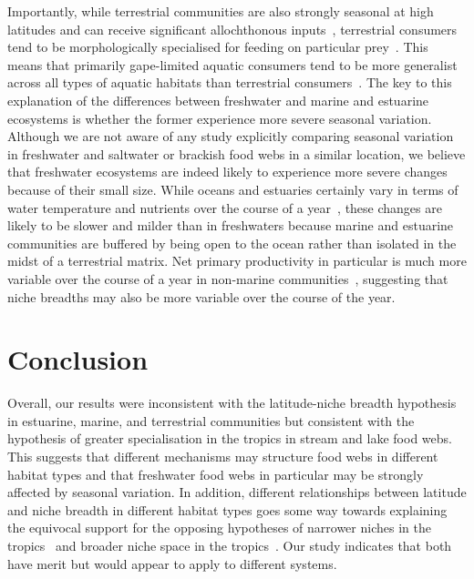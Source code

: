 \documentclass[12pt]{article}
\begin{document}
  Importantly, while terrestrial communities are also strongly seasonal at
  high latitudes and can receive significant allochthonous
  inputs~\cite{Nakano2001}, terrestrial consumers tend to be
  morphologically specialised for feeding on particular prey~\cite{Liem1990}.
  This means that primarily gape-limited aquatic consumers tend to be more
  generalist across all types of aquatic habitats than terrestrial consumers~\cite{Liem1990,Shurin2006}. The
  key to this explanation of the differences between freshwater and
  marine and estuarine  ecosystems is whether the former experience more
  severe seasonal variation. Although we are not aware of any study explicitly
  comparing seasonal variation in freshwater and saltwater or brackish food
  webs in a similar location, we believe that freshwater ecosystems are indeed
  likely to  experience more severe changes because of their small size. While
  oceans and estuaries certainly vary in terms of water temperature and
  nutrients over the course of a year~\cite{Baird1989}, these changes are likely to be slower
  and milder than in freshwaters because marine and estuarine communities are buffered 
  by being open to the ocean rather than isolated
  in the midst of a terrestrial matrix. Net primary productivity in particular is
  much more variable over the course of a year in non-marine communities~\cite{Field1998},
  suggesting that niche breadths may also be more variable over the course of the year.


\section*{Conclusion}

  Overall, our results were inconsistent with the latitude-niche breadth
  hypothesis in estuarine, marine, and terrestrial communities but consistent
  with the hypothesis of greater specialisation in the tropics in stream and
  lake food webs. This suggests that different mechanisms may structure food
  webs in different habitat types and that freshwater food webs in particular
  may be strongly affected by seasonal variation. In addition, different
  relationships between latitude and niche breadth in different habitat types
  goes some way towards explaining the equivocal support for the opposing
  hypotheses of narrower niches in the tropics~\cite{Vazquez2004} and broader
  niche space in the tropics~\cite{Davies2007}. Our study indicates that both 
  have merit but would appear to apply to different systems.
\end{document}
